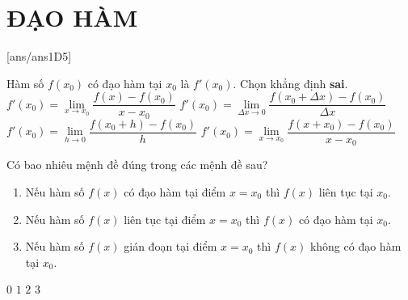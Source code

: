 \section{ĐẠO HÀM}
[ans/ans1D5]
\begin{ex}%
	Hàm số $f(x_0)$ có đạo hàm tại $x_0$ là $f'(x_0)$. Chọn khẳng định \textbf{sai}.
	\choice
	{$f'(x_0) = \lim\limits_{x\to x_0} \dfrac{f(x) - f(x_0)}{x-x_0}$}
	{$f'(x_0) = \lim\limits_{\Delta x\to 0} \dfrac{f(x_0 + \Delta x) - f(x_0)}{\Delta x}$}
	{$f'(x_0) = \lim\limits_{h\to 0} \dfrac{f(x_0 + h) - f(x_0)}{h}$}
	{\True $f'(x_0) = \lim\limits_{x\to x_0} \dfrac{f(x + x_0)-f(x_0)}{x-x_0}$}
\end{ex}

\begin{ex}%
	Có bao nhiêu mệnh đề đúng trong các mệnh đề sau?
	\begin{enumerate}[(1)]
		\item Nếu hàm số $f(x)$ có đạo hàm tại điểm $x = x_0$ thì $f(x)$ liên tục tại $x_0$.
		\item Nếu hàm số $f(x)$ liên tục tại điểm $x = x_0$ thì $f(x)$ có đạo hàm tại $x_0$.
		\item Nếu  hàm số $f(x)$ gián đoạn tại điểm $x = x_0$ thì $f(x)$ không có đạo hàm tại $x_0$.
	\end{enumerate}
	\choice
	{$0$}
	{$1$}
	{\True $2$}
	{$3$}
\end{ex}

